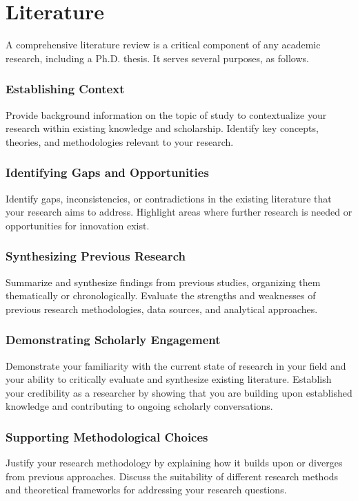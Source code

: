 \chapter{Literature}
\label{section:literature}

A comprehensive literature review is a critical component of any academic research, including a Ph.D. thesis.
It serves several purposes, as follows.

\subsection{Establishing Context}
Provide background information on the topic of study to contextualize your research within existing knowledge and scholarship.
Identify key concepts, theories, and methodologies relevant to your research.

\subsection{Identifying Gaps and Opportunities}
Identify gaps, inconsistencies, or contradictions in the existing literature that your research aims to address.
Highlight areas where further research is needed or opportunities for innovation exist.

\subsection{Synthesizing Previous Research}
Summarize and synthesize findings from previous studies, organizing them thematically or chronologically.
Evaluate the strengths and weaknesses of previous research methodologies, data sources, and analytical approaches.
    
\subsection{Demonstrating Scholarly Engagement}
Demonstrate your familiarity with the current state of research in your field and your ability to critically evaluate and synthesize existing literature.
Establish your credibility as a researcher by showing that you are building upon established knowledge and contributing to ongoing scholarly conversations.
    
\subsection{Supporting Methodological Choices}
Justify your research methodology by explaining how it builds upon or diverges from previous approaches.
Discuss the suitability of different research methods and theoretical frameworks for addressing your research questions.
    
